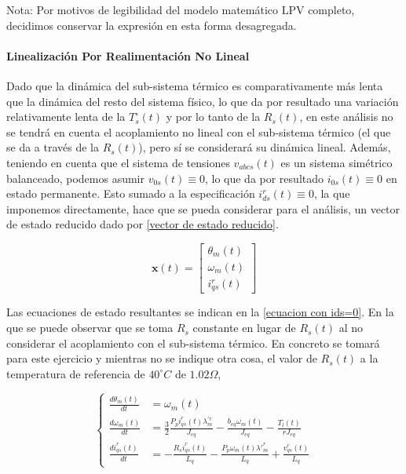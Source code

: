 \documentclass[a4paper, 10pt, onecolumn,journal]{ieeeconf}
\begin{document}
Nota: Por motivos de legibilidad del modelo matemático LPV completo, decidimos conservar la expresión en esta forma desagregada.

\paragraph{\textbf{Linealización Por Realimentación No Lineal}}
Dado que la dinámica del sub-sistema térmico es comparativamente
más lenta que la dinámica del resto del sistema físico, lo que da por resultado
una variación relativamente lenta de la $T^{\circ}_s(t)$ y por lo tanto de la $R_s(t)$,
en este análisis no se tendrá en cuenta el acoplamiento no lineal con el sub-sistema térmico (el que se da a través de la $R_s(t)$), 
pero sí se considerará su dinámica lineal. Además, teniendo en cuenta que el sistema de tensiones $v_{abcs}(t)$ es un sistema
simétrico balanceado, podemos asumir $v_{0s}(t) \equiv 0$, lo que da por resultado $i_{0s}(t) \equiv 0$ en estado permanente. Esto sumado a la especificación $i^{r}_{ds}(t)\equiv0$, 
la que imponemos directamente, hace que se pueda considerar para el análisis, un vector de estado reducido dado por \cref{vector de estado reducido}.

\begin{equation}
    \mathbf{x}(t) = \begin{bmatrix} \theta_m(t) \\ \omega_m(t) \\ i^r_{qs}(t)\end{bmatrix}
    \label{vector de estado reducido}
\end{equation}

Las ecuaciones de estado resultantes se indican en la \cref{ecuacion con ids=0}.
En la que se puede observar que se toma $R_s$ constante en lugar  de $R_s(t)$ al
no considerar el acoplamiento con el sub-sistema térmico. En concreto
se tomará para este ejercicio y mientras no se indique otra cosa, el valor de 
$R_s(t)$ a la temperatura de referencia de $40^\circ C$ de $1.02 \Omega$, \cite{c1}%

\begin{equation}
	\begin{cases}
		\frac{d \theta_m(t)}{dt}  &= {\omega}_m(t)\\
		\frac{d \omega_m(t)}{dt}  &= \frac{3}{2} \frac{P_p i^r_{qs}(t)\lambda^{'r}_m}{J_{eq}} - \frac{b_{eq}\omega_m(t)}{J_{eq}} - \frac{T_l(t)}{r J_{eq}}\\
		\frac{d i^r_{qs}(t)}{dt}  &= -\frac{R_s i^r_{qs}(t)}{L_q} - \frac{P_p \omega_m(t) \lambda'^r_m}{L_q}+ \frac{v^r_{qs}(t)}{L_q}
    \end{cases}
	\label{ecuacion con ids=0}
\end{equation}
\end{document}
